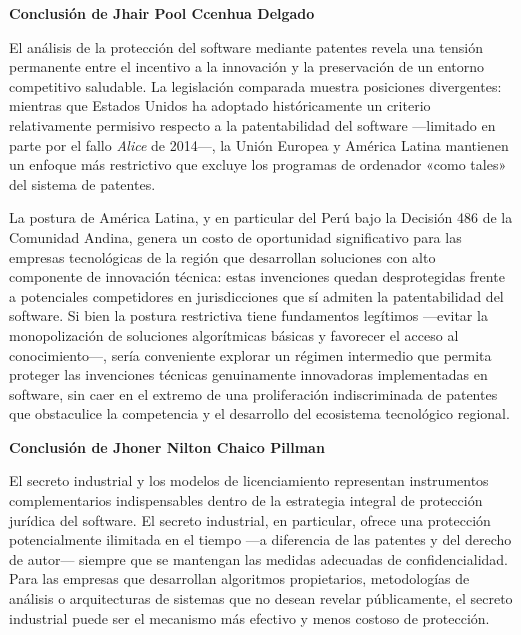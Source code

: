 \documentclass[11pt,a4paper]{report}
\begin{document}
\vspace{0.8cm}

\noindent\textbf{Conclusión de Jhair Pool Ccenhua Delgado}

\smallskip

El análisis de la protección del software mediante patentes revela una tensión permanente entre el incentivo a la innovación y la preservación de un entorno competitivo saludable. La legislación comparada muestra posiciones divergentes: mientras que Estados Unidos ha adoptado históricamente un criterio relativamente permisivo respecto a la patentabilidad del software —limitado en parte por el fallo \textit{Alice} de 2014—, la Unión Europea y América Latina mantienen un enfoque más restrictivo que excluye los programas de ordenador «como tales» del sistema de patentes.

La postura de América Latina, y en particular del Perú bajo la Decisión 486 de la Comunidad Andina, genera un costo de oportunidad significativo para las empresas tecnológicas de la región que desarrollan soluciones con alto componente de innovación técnica: estas invenciones quedan desprotegidas frente a potenciales competidores en jurisdicciones que sí admiten la patentabilidad del software. Si bien la postura restrictiva tiene fundamentos legítimos —evitar la monopolización de soluciones algorítmicas básicas y favorecer el acceso al conocimiento—, sería conveniente explorar un régimen intermedio que permita proteger las invenciones técnicas genuinamente innovadoras implementadas en software, sin caer en el extremo de una proliferación indiscriminada de patentes que obstaculice la competencia y el desarrollo del ecosistema tecnológico regional.

\vspace{0.8cm}

\noindent\textbf{Conclusión de Jhoner Nilton Chaico Pillman}

\smallskip

El secreto industrial y los modelos de licenciamiento representan instrumentos complementarios indispensables dentro de la estrategia integral de protección jurídica del software. El secreto industrial, en particular, ofrece una protección potencialmente ilimitada en el tiempo —a diferencia de las patentes y del derecho de autor— siempre que se mantengan las medidas adecuadas de confidencialidad. Para las empresas que desarrollan algoritmos propietarios, metodologías de análisis o arquitecturas de sistemas que no desean revelar públicamente, el secreto industrial puede ser el mecanismo más efectivo y menos costoso de protección.
\end{document}
